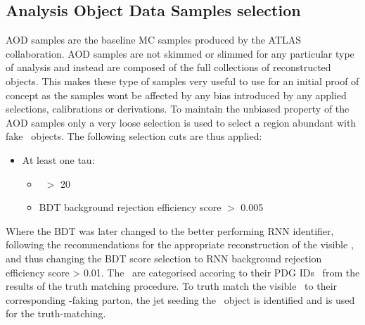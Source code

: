 	\subsection{Analysis Object Data Samples selection}
	\label{subsec:AODsel}
	\ac{AOD} samples are the baseline \ac{MC} samples produced by the \ac{ATLAS} collaboration. \ac{AOD} samples are not skimmed or slimmed for any particular type of analysis and instead are composed of the full collections of reconstructed objects. This makes these type of samples very useful to use for an initial proof of concept as the samples wont be affected by any bias introduced by any applied selections, calibrations or derivations. 
	To maintain the unbiased property of the \ac{AOD} samples only a very loose selection is used to select a region abundant with fake \htau\ objects.
	 The following selection cuts are thus applied: 
	\begin{itemize}
	\item At least one tau:
		\begin{itemize}
		\item \pt\ $>$ 20 \gev
		\item \ac{BDT} background rejection efficiency score $>$ 0.005 
		\end{itemize}
	\end{itemize}
	Where the \ac{BDT} was later changed to the better performing \ac{RNN} identifier, following the recommendations for the appropriate reconstruction of the visible \htau, and thus changing the \ac{BDT} score  selection to RNN background rejection efficiency score > 0.01.
	The \htau\ are categorised accoring to their \ac{PDG ID}s~\cite{PDG} from the results of the truth  matching procedure.
	To truth match the visible \htau\ to their corresponding \htau -faking parton, the jet seeding the \htau\ object is identified and is used for the truth-matching.
